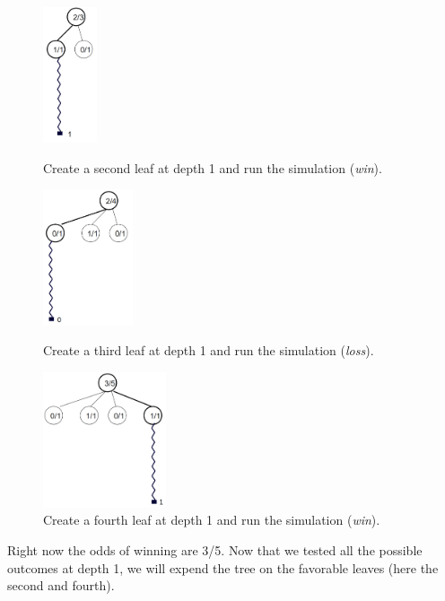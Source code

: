 \begin{figure}[H]
\centering
	\begin{minipage}[b]{0.3\linewidth}
		\centering
		\includegraphics[height=4cm]{1_Presentation/1.2_Algorithm_MCTS_Benoit/img/3.png}
		\caption{\label{fig:3}Create a second leaf at depth 1 and run the simulation (\textit{win}).}
	\end{minipage}%
	\hspace*{1cm}
	\begin{minipage}[b]{0.3\linewidth}
		\centering
		\includegraphics[height=4cm]{1_Presentation/1.2_Algorithm_MCTS_Benoit/img/4.png}
		\caption{\label{fig:4}Create a third leaf at depth 1 and run the simulation (\textit{loss}).}
	\end{minipage}%
	\hspace*{1cm}
	\begin{minipage}[b]{0.3\linewidth}
		\centering
		\includegraphics[height=4cm]{1_Presentation/1.2_Algorithm_MCTS_Benoit/img/5.png}
		\caption{\label{fig:5}Create a fourth leaf at depth 1 and run the simulation (\textit{win}).}
	\end{minipage}%
\end{figure}

Right now the odds of winning are 3/5. Now that we tested all the possible outcomes at depth 1, we will expend the tree on the favorable leaves (here the second and fourth).

